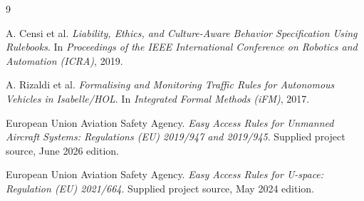 \documentclass[11pt,a4paper]{article}
\begin{document}
\begin{thebibliography}{9}

A. Censi et al.
\newblock \emph{Liability, Ethics, and Culture-Aware Behavior Specification Using Rulebooks}.
\newblock In \emph{Proceedings of the IEEE International Conference on Robotics and Automation (ICRA)}, 2019.

A. Rizaldi et al.
\newblock \emph{Formalising and Monitoring Traffic Rules for Autonomous Vehicles in Isabelle/HOL}.
\newblock In \emph{Integrated Formal Methods (iFM)}, 2017.

European Union Aviation Safety Agency.
\newblock \emph{Easy Access Rules for Unmanned Aircraft Systems: Regulations (EU) 2019/947 and 2019/945}.
\newblock Supplied project source, June 2026 edition.

European Union Aviation Safety Agency.
\newblock \emph{Easy Access Rules for U-space: Regulation (EU) 2021/664}.
\newblock Supplied project source, May 2024 edition.

\end{thebibliography}
\end{document}
